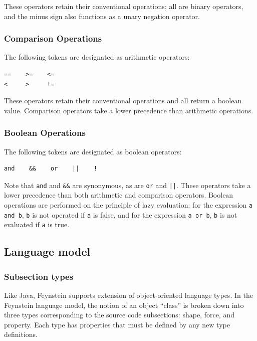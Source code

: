 These operators retain their conventional operations; all are binary
operators, and the minus sign also functions as a unary negation
operator.

\subsubsection{Comparison Operations}

The following tokens are designated as arithmetic operators:
\begin{verbatim}
==    >=    <=   
<     >     !=
\end{verbatim}

These operators retain their conventional operations and all return a
boolean value. Comparison operators take a lower precedence than
arithmetic operations.

\subsubsection{Boolean Operations}

The following tokens are designated as boolean operators:
\begin{verbatim}
and    &&    or    ||    !
\end{verbatim}

Note that \texttt{and} and \texttt{\&\&} are synonymous, as are
\texttt{or} and \texttt{||}. These operators take a lower precedence
than both arithmetic and comparison operators. Boolean operations are
performed on the principle of lazy evaluation: for the expression
\texttt{a and b}, \texttt{b} is not operated if \texttt{a} is false,
and for the expression \texttt{a or b}, \texttt{b} is not evaluated if
\texttt{a} is true.

\subsection{Language model}

\subsubsection{Subsection types}
Like Java, Feynstein supports extension of object-oriented language
types. In the Feynstein language model, the notion of an object
``class'' is broken down into three types corresponding to the source
code subsections: shape, force, and property. Each type has properties
that must be defined by any new type definitions.

